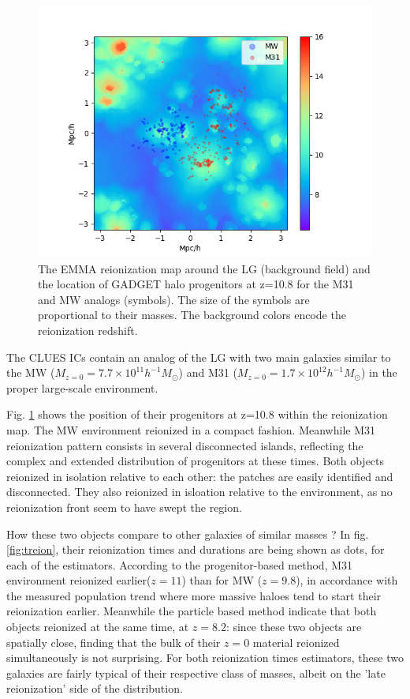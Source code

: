 \documentclass[twocolumn]{aastex61}
\begin{document}
\begin{figure}[ht]
\includegraphics[width=1.2\columnwidth]{img/map_LG.png}
\caption{The EMMA reionization map around the LG (background field) and the location of GADGET halo progenitors at z=10.8 for the M31 and MW analogs (symbols). The size of the symbols are proportional to their masses. The background colors encode the reionization redshift.}
\label{fig:LG}
\end{figure}

The CLUES ICs contain an analog of the LG with two main galaxies similar to the MW ($M_{z=0}=7.7\times 10^{11} h^{-1} M_\odot$) and M31 ($M_{z=0}=1.7 \times 10^{12} h^{-1} M_\odot$) in the proper large-scale environment.

Fig. \ref{fig:LG} shows the position of their progenitors at z=10.8 within the reionization map. The MW environment reionized in a compact fashion. Meanwhile M31 reionization pattern consists in several disconnected islands, reflecting the complex and extended distribution of progenitors at these times. Both objects reionized in isolation relative to each other: the patches are easily identified and disconnected. They also reionized in isloation relative to the environment, as no reionization front seem to have swept the region.



How these two objects compare to other galaxies of similar masses ? In fig. \ref{fig:treion}, their reionization times and durations are being shown as dots, for each of the estimators. According to the progenitor-based method, M31 environment reionized earlier($z=11$) than for MW ($z=9.8$), in accordance with the measured population trend where more massive haloes tend to start their reionization earlier. Meanwhile the particle based method indicate that both objects reionized at the same time, at $z=8.2$: since these two objects are spatially close, finding that the bulk of their $z=0$ material  reionized simultaneously is not surprising. For both reionization times estimators, these two galaxies are fairly typical of their respective class of masses, albeit on the 'late reionization' side of the distribution. 
\end{document}
